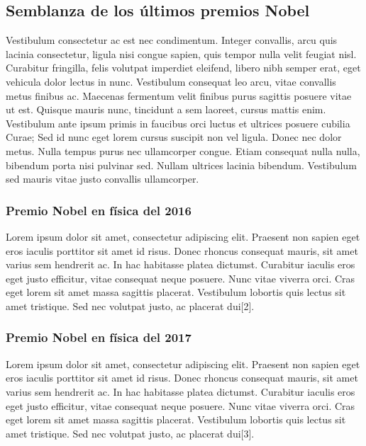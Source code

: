\documentclass[12pt]{article}
\begin{document}
\medskip

\subsection{Semblanza de los últimos premios Nobel}

Vestibulum consectetur ac est nec condimentum. Integer convallis, arcu quis lacinia consectetur, ligula nisi congue sapien, quis tempor nulla velit feugiat nisl. Curabitur fringilla, felis volutpat imperdiet eleifend, libero nibh semper erat, eget vehicula dolor lectus in nunc. Vestibulum consequat leo arcu, vitae convallis metus finibus ac. Maecenas fermentum velit finibus purus sagittis posuere vitae ut est. Quisque mauris nunc, tincidunt a sem laoreet, cursus mattis enim. Vestibulum ante ipsum primis in faucibus orci luctus et ultrices posuere cubilia Curae; Sed id nunc eget lorem cursus suscipit non vel ligula. Donec nec dolor metus. Nulla tempus purus nec ullamcorper congue. Etiam consequat nulla nulla, bibendum porta nisi pulvinar sed. Nullam ultrices lacinia bibendum. Vestibulum sed mauris vitae justo convallis ullamcorper.

\bigskip

\subsubsection{Premio Nobel en física del 2016}

Lorem ipsum dolor sit amet, consectetur adipiscing elit. Praesent non sapien eget eros iaculis porttitor sit amet id risus. Donec rhoncus consequat mauris, sit amet varius sem hendrerit ac. In hac habitasse platea dictumst. Curabitur iaculis eros eget justo efficitur, vitae consequat neque posuere. Nunc vitae viverra orci. Cras eget lorem sit amet massa sagittis placerat. Vestibulum lobortis quis lectus sit amet tristique. Sed nec volutpat justo, ac placerat dui[2]. 

\subsubsection{Premio Nobel en física del 2017}

Lorem ipsum dolor sit amet, consectetur adipiscing elit. Praesent non sapien eget eros iaculis porttitor sit amet id risus. Donec rhoncus consequat mauris, sit amet varius sem hendrerit ac. In hac habitasse platea dictumst. Curabitur iaculis eros eget justo efficitur, vitae consequat neque posuere. Nunc vitae viverra orci. Cras eget lorem sit amet massa sagittis placerat. Vestibulum lobortis quis lectus sit amet tristique. Sed nec volutpat justo, ac placerat dui[3]. 
\end{document}
